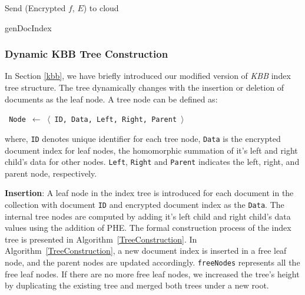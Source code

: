 \documentclass[sigconf,pdftex]{acmart}
\begin{document}




\begin{algorithm}[!b]
\small{
\SetAlgoLined
{}
 
 Send (Encrypted $f$, $E$) to cloud\;
 \caption{genDocIndex}
 \label{encdoc}
 }
\end{algorithm}



\subsubsection{\textbf{Dynamic KBB Tree Construction}}\label{kbb-construction}

In Section \ref{kbb}, we have briefly introduced our modified version of \textit{KBB} index tree structure. The tree dynamically changes with the insertion or deletion of documents as the leaf node. A tree node can be defined as:
\begin{center} 
{\texttt{
 Node $\leftarrow$ $\langle$ ID, Data, Left, Right, Parent $\rangle$}
}
\end{center}
where, \texttt{ID} denotes unique identifier for each tree node, \texttt{Data} is the encrypted document index for leaf nodes, the homomorphic summation of it's left and right child's data for other nodes. \texttt{Left}, \texttt{Right} and \texttt{Parent} indicates the left, right, and parent node, respectively.


\textbf{Insertion}: A leaf node in the index tree is introduced for each document in the collection with document \texttt{ID} and encrypted document index as the \texttt{Data}. The internal tree nodes are computed by adding it's left child and right child's data values using the addition of PHE. The formal construction process of the index tree is presented in Algorithm~\ref{TreeConstruction}. In Algorithm~\ref{TreeConstruction}, a new document index is inserted in a free leaf node, and the parent nodes are updated accordingly. \texttt{freeNodes} represents all the free leaf nodes. If there are no more free leaf nodes, we increased the tree's height by duplicating the existing tree and merged both trees under a new root.
\end{document}
